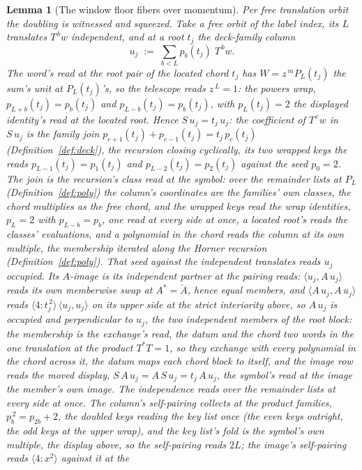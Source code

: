 \documentclass[11pt]{article}
\newtheorem{lemma}{Lemma}
\theoremstyle{definition}
\begin{document}
\begin{lemma}[The window floor fibers over momentum]
Per free translation orbit the doubling is witnessed and squeezed.
Take a free orbit of the label index, its $L$ translates $T^{\,b}w$
independent, and at a root $t_j$ the deck-family column
\[
u_j\;:=\;\sum_{b<L}p_b(t_j)\;T^{\,b}w .
\]
The word's read at the root pair of the located chord $t_j$ has
$W=z^{\,m}P_L(t_j)$ the sum's unit at $P_L(t_j)$'s, so the telescope
reads $z^{\,L}=1$: the powers wrap, $p_{L+b}(t_j)=p_b(t_j)$ and
$p_{L-b}(t_j)=p_b(t_j)$, with $p_L(t_j)=2$ the displayed identity's
read at the located root. Hence $S\,u_j=t_j\,u_j$: the coefficient of
$T^{\,c}w$ in $S\,u_j$ is the family join
$p_{c+1}(t_j)+p_{c-1}(t_j)=t_j\,p_c(t_j)$
(Definition~\ref{def:deck}), the recursion closing cyclically, its
two wrapped keys the reads $p_{L-1}(t_j)=p_1(t_j)$ and
$p_{L-2}(t_j)=p_2(t_j)$ against the seed $p_0=2$. The join is the
recursion's class read at the symbol: over the remainder lists at
$P_L$ (Definition~\ref{def:poly}) the column's coordinates are the
families' own classes, the chord multiplies as the free chord, and
the wrapped keys read the wrap identities, $p_L=2$ with
$p_{L-b}=p_b$, one read at every side at once, a located root's
reads the classes' evaluations, and a polynomial in the chord
reads the column at its own multiple, the membership iterated
along the Horner recursion (Definition~\ref{def:poly}). That seed against
the independent translates reads $u_j$ occupied. Its $A$-image is its
independent partner at the pairing reads: $\langle u_j,A\,u_j\rangle$
reads its own memberwise swap at $A^{*}=\check A$, hence
equal members, and $\langle A\,u_j,A\,u_j\rangle$ reads
$\langle4\!:\!t_j^{\,2}\rangle\,\langle u_j,u_j\rangle$ on its upper
side at the strict interiority above, so $A\,u_j$ is occupied and
perpendicular to $u_j$, the two independent members of the root
block: the membership is the exchange's read, the datum and the
chord two words in the one translation at the product
$T^{*}T=1$, so they exchange with every polynomial in the
chord across it, the datum maps each chord block to itself, and
the image row reads the moved display,
$S\,A\,u_j=A\,S\,u_j=t_j\,A\,u_j$, the symbol's read at the image
the member's own image. The independence reads over the remainder lists at every
side at once. The column's self-pairing collects at the product
families, $p_b^{\,2}=p_{2b}+2$, the doubled keys reading the key
list once (the even keys outright, the odd keys at the upper wrap),
and the key list's fold is the symbol's own multiple, the display
above, so the self-pairing reads $2L$; the
image's
self-pairing reads $\langle4\!:\!x^{2}\rangle$ against it at the

\end{lemma}
\end{document}
